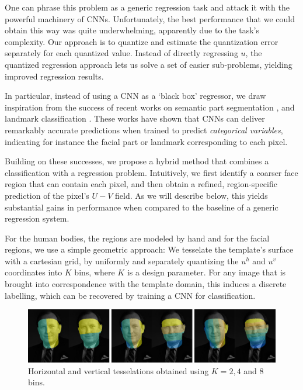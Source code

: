 One can phrase this problem as a generic regression task and attack it with the powerful machinery of CNNs. Unfortunately, the best performance that we could obtain this way was quite underwhelming, apparently due to the task's complexity. Our approach is to quantize and estimate the quantization error separately for each quantized value. Instead of directly regressing $u$, the quantized regression approach lets us solve a set of easier sub-problems, yielding improved regression results.

In particular,	instead of  using a CNN as a `black box' regressor, we draw inspiration from the success of recent works on semantic part  segmentation \cite{tsogkas2015deep,CP2016Deeplab}, and landmark classification \cite{bulat2016human,bulat2016two}. These works have shown that CNNs can deliver remarkably accurate predictions when trained to predict \textit{categorical variables}, indicating for instance the facial part or landmark corresponding to each pixel. 
    
Building on these successes, we propose a hybrid method that combines a classification with a regression problem. Intuitively, we first identify a coarser face region that can contain each pixel, and then obtain a refined, region-specific prediction of the pixel's $U-V$  field. As we will describe below, this yields substantial gains in performance when compared to the baseline of a generic regression system. 

For the human bodies, the regions are modeled by hand and for the facial regions, we use a simple geometric approach:
We tesselate the template's surface with a cartesian grid, by uniformly and separately quantizing the $u^h$ and $u^v$ coordinates into $K$ bins, where $K$ is a design parameter. For any image that is brought into correspondence with the template domain, this induces a discrete labelling, which can be recovered by training a  CNN for classification.
    
\begin{figure}[h]
\begin{center}
    \includegraphics[width=1\linewidth ]{resources/Human_Poses/discreteFaces}
\end{center}
    \caption{Horizontal and vertical tesselations obtained using $K=2,4$ and $8$ bins.}
\label{fig:DiscreteFaces}
\end{figure}

